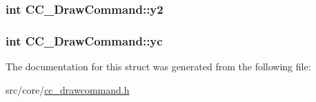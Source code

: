 \hypertarget{a00031_a22b01120d695ad8298ade1495ad25732}{
\subsubsection[{y2}]{\setlength{\rightskip}{0pt plus 5cm}int C\-C\-\_\-\-Draw\-Command\-::y2}}\label{a00031_a22b01120d695ad8298ade1495ad25732}
\hypertarget{a00031_aa60a4aa36130b9ae6aae267ed96a4d03}{
\subsubsection[{yc}]{\setlength{\rightskip}{0pt plus 5cm}int C\-C\-\_\-\-Draw\-Command\-::yc}}\label{a00031_aa60a4aa36130b9ae6aae267ed96a4d03}


The documentation for this struct was generated from the following file\-:\begin{DoxyCompactItemize}
\item 
src/core/\hyperlink{a00205}{cc\-\_\-drawcommand.\-h}\end{DoxyCompactItemize}

